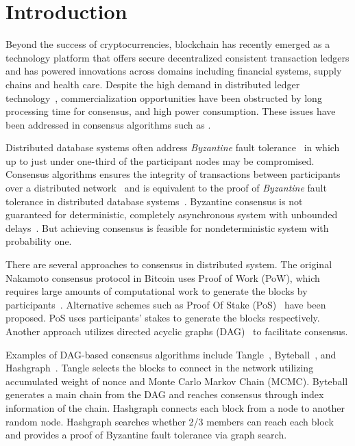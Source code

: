 \documentclass[preprint,12pt]{elsarticle}
\begin{document}
\section{Introduction}\label{ch:intro}

Beyond the success of cryptocurrencies, blockchain has recently emerged as a technology platform that offers secure decentralized consistent transaction ledgers and has powered innovations across domains including financial systems, supply chains and health care.
Despite the high demand in distributed ledger technology~\cite{bcbook15}, commercialization opportunities have been obstructed by long processing time for consensus, and high power consumption. These issues have been addressed in consensus algorithms such as \cite{algorand16, algorand17, sompolinsky2016spectre, PHANTOM08}. 

Distributed database systems often address \emph{Byzantine} fault tolerance~\cite{Lamport82} in which up to just under one-third of the participant nodes may be compromised. Consensus algorithms ensures the integrity of transactions between participants over a distributed network~\cite{Lamport82} and is equivalent to the proof of \emph{Byzantine} fault tolerance in distributed database systems~\cite{randomized03, paxos01}. 
 Byzantine consensus is not guaranteed for deterministic, completely asynchronous system with unbounded delays~\cite{flp}. But achieving consensus is feasible for nondeterministic system with probability one. 

There are several approaches to consensus in distributed system.
The original Nakamoto consensus protocol in Bitcoin uses Proof of Work (PoW), which requires large amounts of computational work to generate the blocks by participants~\cite{bitcoin08}.  Alternative schemes such as Proof Of Stake (PoS)~\cite{ppcoin12,dpos14} have been proposed. PoS uses participants' stakes to generate the blocks respectively. 
Another approach utilizes directed acyclic graphs (DAG)~\cite{dagcoin15, sompolinsky2016spectre, PHANTOM08, PARSEC18, conflux18} to facilitate consensus. 

Examples of DAG-based consensus algorithms include Tangle~\cite{tangle17}, Byteball~\cite{byteball16}, and Hashgraph~\cite{hashgraph16}. Tangle selects the blocks to connect in the network utilizing accumulated weight of nonce and Monte Carlo Markov Chain (MCMC). Byteball generates a main chain from the DAG and reaches consensus through index information of the chain. Hashgraph connects each block from a node to another random node. Hashgraph searches whether 2/3 members can reach each block and provides a proof of Byzantine fault tolerance via graph search.
\end{document}

